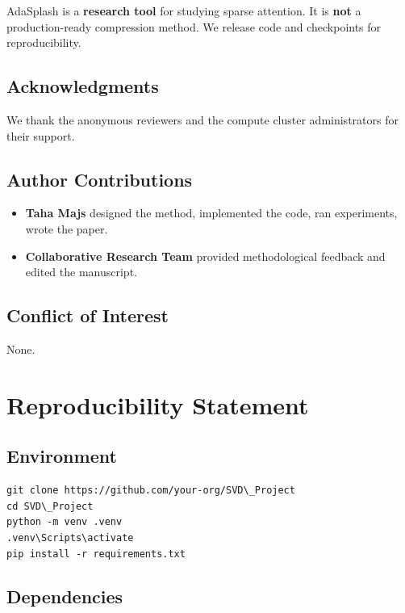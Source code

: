 AdaSplash is a \textbf{research tool} for studying sparse attention. It is 
\textbf{not} a production-ready compression method. We release code and checkpoints 
for reproducibility.

\subsection{Acknowledgments}

We thank the anonymous reviewers and the compute cluster administrators for their support.

\subsection{Author Contributions}

\begin{itemize}
\item \textbf{Taha Majs} designed the method, implemented the code, ran experiments,
  wrote the paper.
\item \textbf{Collaborative Research Team} provided methodological feedback and edited the manuscript.

\end{itemize}
\subsection{Conflict of Interest}

None.


\section{Reproducibility Statement}

\subsection{Environment}

\begin{lstlisting}
git clone https://github.com/your-org/SVD\_Project
cd SVD\_Project
python -m venv .venv
.venv\Scripts\activate
pip install -r requirements.txt
\end{lstlisting}

\subsection{Dependencies}

